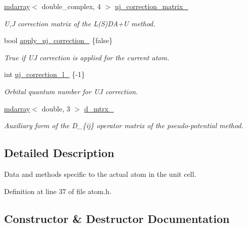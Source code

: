\begin{DoxyCompactItemize}
\hyperlink{classsddk_1_1mdarray}{mdarray}$<$ double\+\_\+complex, 4 $>$ \hyperlink{classsirius_1_1_atom_a726686bb7f7d0efe87980b93496a4315}{uj\+\_\+correction\+\_\+matrix\+\_\+}
\begin{DoxyCompactList}\small\item\em U,J correction matrix of the L(\+S)D\+A+\+U method. \end{DoxyCompactList}\item 
bool \hyperlink{classsirius_1_1_atom_a3abd3bfce30e865efd825d2411a45713}{apply\+\_\+uj\+\_\+correction\+\_\+} \{false\}
\begin{DoxyCompactList}\small\item\em True if U\+J correction is applied for the current atom. \end{DoxyCompactList}\item 
int \hyperlink{classsirius_1_1_atom_adcf069a095d4f0f9b1c5debe34e6ed94}{uj\+\_\+correction\+\_\+l\+\_\+} \{-\/1\}
\begin{DoxyCompactList}\small\item\em Orbital quantum number for U\+J correction. \end{DoxyCompactList}\item 
\hyperlink{classsddk_1_1mdarray}{mdarray}$<$ double, 3 $>$ \hyperlink{classsirius_1_1_atom_a735ddc6a81305dbc5b2ddf5d96b6baaa}{d\+\_\+mtrx\+\_\+}
\begin{DoxyCompactList}\small\item\em Auxiliary form of the D\+\_\+\{ij\} operator matrix of the pseudo-\/potential method. \end{DoxyCompactList}\end{DoxyCompactItemize}


\subsection{Detailed Description}
Data and methods specific to the actual atom in the unit cell. 

Definition at line 37 of file atom.\+h.



\subsection{Constructor \& Destructor Documentation}
\hypertarget{classsirius_1_1_atom_a8463863f95273d4b427c362e881a957b}{}
